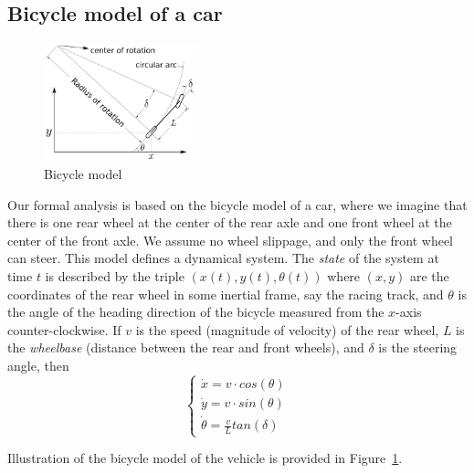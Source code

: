\subsection{Bicycle model of a car}

\begin{figure}
\centering
\includegraphics[width=45mm]{Figures/BicycleModel-coords.pdf}%
\caption{Bicycle model \cite{Snider.2009}}
\label{fig:bicycle}%
\end{figure}

Our formal analysis is based on the
bicycle model of a car, where we imagine that there is one rear wheel at the center of the rear axle and one front wheel at the center of the front axle.
We assume no wheel slippage, and only the front wheel can steer.
This model defines a dynamical system.
The \emph{state} of the system at time $t$
is described by the triple $(x(t), y(t), \theta(t))$
where $(x, y)$ are the coordinates of the rear wheel
in some inertial frame, say the racing track, and
$\theta$ is the angle of the heading direction of the bicycle measured from the $x$-axis counter-clockwise.
If $v$ is the speed (magnitude of velocity) of the rear wheel,
$L$ is the \emph{wheelbase} (distance between the rear and front wheels),
and $\delta$ is the steering angle,
then
\[
\left\{
\begin{array}{l}
     \dot{x} = v \cdot cos(\theta) \\
     \dot{y} = v \cdot sin(\theta) \\
     \dot{\theta} = \frac{\displaystyle v}{L} tan(\delta)
\end{array}
\right.
\]

Illustration of the bicycle model of the vehicle is provided in Figure~\ref{fig:bicycle}.
